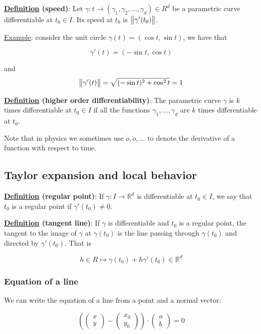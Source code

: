 \documentclass[10pt]{extarticle}
\newcommand{\R}{\mathbb{R}}
\begin{document}
\textbf{\underline{Definition} (speed)}: Let $\gamma: t \to (\gamma_1, \gamma_2, \ldots, \gamma_d) \in R^d$ be a parametric curve differentiable at $t_0 \in I$.
Its speed at $t_0$ is $\norm{\gamma'(t_0)}$.

\underline{Example}: consider the unit circle $\gamma(t) = (\cos t, \sin t)$, we have that

$$
    \gamma'(t) = (-\sin t, \cos t)
$$

and
$$
    \norm{\gamma'(t)} = \sqrt{(-\sin t)^2 + \cos^2 t} = 1
$$

\textbf{\underline{Definition} (higher order differentiability)}:
The parametric curve $\gamma$ is $k$ times differentiable at $t_0 \in I$ if all the functions $\gamma_1, \ldots, \gamma_d$ are $k$ times differentiable at $t_0$.

Note that in physics we sometimes use $\dot{o}, \ddot{o}, \ldots$ to denote the derivative of a function with respect to time.

\subsection{Taylor expansion and local behavior}

\textbf{\underline{Definition} (regular point)}:
If $\gamma: I \to \R^d$ is differentiable at $t_0 \in I$, we say that $t_0$ is a regular point if $\gamma'(t_0) \neq \underline{0}$.

\textbf{\underline{Definition} (tangent line)}:
If $\gamma$ is differentiable and $t_0$ is a regular point, the tangent to the image of $\gamma$ at $\gamma(t_0)$ is the line passing through $\gamma(t_0)$ and directed by $\gamma'(t_0)$.
That is

$$
    h \in R \mapsto \gamma(t_0) + h \gamma'(t_0) \in \R^d
$$

\subsubsection{Equation of a line}

We can write the equation of a line from a point and a normal vector:

$$
    \left(
    \begin{pmatrix}
            x \\ y
        \end{pmatrix} - \begin{pmatrix}
            x_0 \\ y_0
        \end{pmatrix}
    \right) \cdot \begin{pmatrix}
        a \\ b
    \end{pmatrix} = 0
$$
\end{document}
